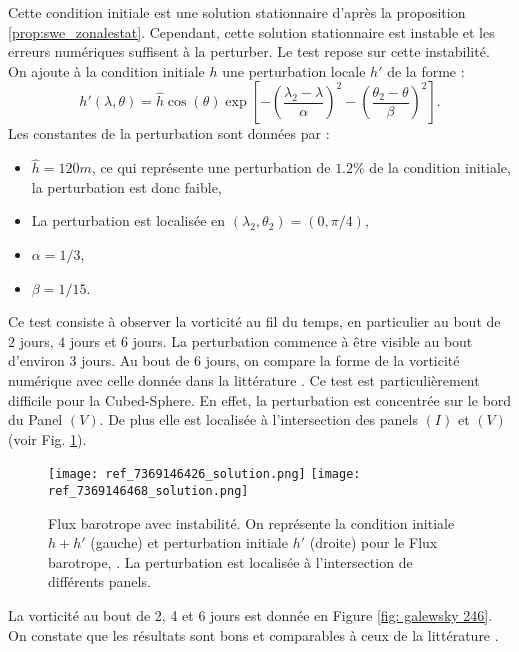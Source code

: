 Cette condition initiale est une solution stationnaire d'après la proposition \ref{prop:swe_zonalestat}. Cependant, cette solution stationnaire est instable et les erreurs numériques suffisent à la perturber. Le test repose sur cette instabilité. On ajoute à la condition initiale $h$ une perturbation locale $h'$ de la forme :
\begin{equation}
h'(\lambda, \theta) = \hat{h} \cos ( \theta ) \exp \left[ - \left( \dfrac{\lambda_2 - \lambda}{\alpha} \right)^2 - \left( \dfrac{\theta_2 - \theta}{\beta} \right)^2 \right].
\end{equation}
Les constantes de la perturbation sont données par :
\begin{itemize}
\item $\hat{h} = 120 \si{m}$, ce qui représente une perturbation de $1.2 \%$ de la condition initiale, la perturbation est donc faible,
\item La perturbation est localisée en $(\lambda_2, \theta_2) = (0, \pi/4)$,
\item $\alpha = 1/3$,
\item $\beta = 1/15$.
\end{itemize}

Ce test consiste à observer la vorticité au fil du temps, en particulier au bout de $2$ jours, $4$ jours et $6$ jours. La perturbation commence à être visible au bout d'environ 3 jours. Au bout de 6 jours, on compare la forme de la vorticité numérique avec celle donnée dans la littérature \cite{Galewsky2004, Chen2008}. Ce test est particulièrement difficile pour la Cubed-Sphere. En effet, la perturbation est concentrée sur le bord du Panel $(V)$. De plus elle est localisée à l'intersection des panels $(I)$ et $(V)$ (voir Fig. \ref{fig: initiale et perturbation Galewsky}).

\begin{figure}[htbp]
\begin{center}
\texttt{[image: ref\_7369146426\_solution.png]}
\texttt{[image: ref\_7369146468\_solution.png]}
\end{center}
\caption{Flux barotrope avec instabilité. On représente la condition initiale $h+h'$ (gauche) et perturbation initiale $h'$ (droite) pour le Flux barotrope, \cite{Galewsky2004}. La perturbation est localisée à l'intersection de différents panels.}
\label{fig: initiale et perturbation Galewsky}
\end{figure}

La vorticité au bout de 2, 4 et 6 jours est donnée en Figure \ref{fig: galewsky 246}. On constate que les résultats sont bons et comparables à ceux de la littérature \cite{Chen2008, Galewsky2004, Nair2005}. 

